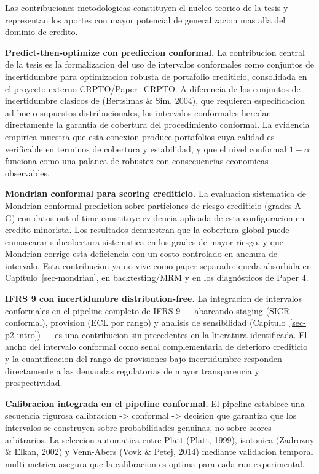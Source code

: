 \documentclass[
  spanish,
  11pt,
  letterpaper,
]{scrbook}
\theoremstyle{plain}
\theoremstyle{remark}
\begin{document}
Las contribuciones metodologicas constituyen el nucleo teorico de la
tesis y representan los aportes con mayor potencial de generalizacion
mas alla del dominio de credito.

\textbf{Predict-then-optimize con prediccion conformal.} La contribucion
central de la tesis es la formalizacion del uso de intervalos
conformales como conjuntos de incertidumbre para optimizacion robusta de
portafolio crediticio, consolidada en el proyecto externo
CRPTO/Paper\_CRPTO. A diferencia de los conjuntos de incertidumbre
clasicos de (Bertsimas \& Sim, 2004), que requieren especificacion ad
hoc o supuestos distribucionales, los intervalos conformales heredan
directamente la garantia de cobertura del procedimiento conformal. La
evidencia empirica muestra que esta conexion produce portafolios cuya
calidad es verificable en terminos de cobertura y estabilidad, y que el
nivel conformal \(1-\alpha\) funciona como una palanca de robustez con
consecuencias economicas observables.

\textbf{Mondrian conformal para scoring crediticio.} La evaluacion
sistematica de Mondrian conformal prediction sobre particiones de riesgo
crediticio (grades A--G) con datos out-of-time constituye evidencia
aplicada de esta configuracion en credito minorista. Los resultados
demuestran que la cobertura global puede enmascarar subcobertura
sistematica en los grades de mayor riesgo, y que Mondrian corrige esta
deficiencia con un costo controlado en anchura de intervalo. Esta
contribucion ya no vive como paper separado: queda absorbida en
Capítulo~\ref{sec-mondrian}, en backtesting/MRM y en los diagnósticos de
Paper 4.

\textbf{IFRS 9 con incertidumbre distribution-free.} La integracion de
intervalos conformales en el pipeline completo de IFRS 9 --- abarcando
staging (SICR conformal), provision (ECL por rango) y analisis de
sensibilidad (Capítulo~\ref{sec-p2-intro}) --- es una contribucion sin
precedentes en la literatura identificada. El ancho del intervalo
conformal como senal complementaria de deterioro crediticio y la
cuantificacion del rango de provisiones bajo incertidumbre responden
directamente a las demandas regulatorias de mayor transparencia y
prospectividad.

\textbf{Calibracion integrada en el pipeline conformal.} El pipeline
establece una secuencia rigurosa calibracion -\textgreater{} conformal
-\textgreater{} decision que garantiza que los intervalos se construyen
sobre probabilidades genuinas, no sobre scores arbitrarios. La seleccion
automatica entre Platt (Platt, 1999), isotonica (Zadrozny \& Elkan,
2002) y Venn-Abers (Vovk \& Petej, 2014) mediante validacion temporal
multi-metrica asegura que la calibracion es optima para cada run
experimental.
\end{document}
